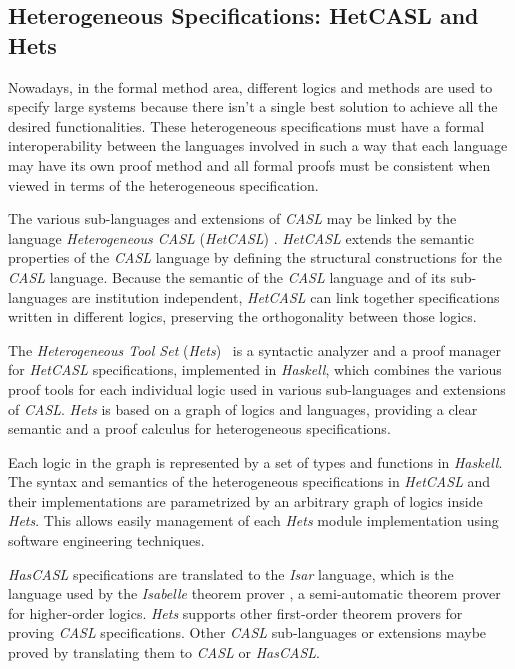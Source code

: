 \documentclass[12pt,twoside]{article}
\numberwithin{spec}{subsection}
\numberwithin{proof}{subsection}
\numberwithin{figure}{subsection}
\numberwithin{code}{subsection}
\begin{document}
\subsection{Heterogeneous Specifications: HetCASL and Hets}
Nowadays, in the formal method area, different logics and methods are used to specify large systems because there isn't a single best solution to achieve all the desired functionalities. These heterogeneous specifications must have a formal interoperability between the languages involved in such a way that each language may have its own proof method and all formal proofs must be consistent when viewed in terms of the heterogeneous specification. 

The various sub-languages and extensions of \textit{CASL} may be linked by the language \textit{Heterogeneous CASL} (\textit{HetCASL}) \citep{MossakowskiEtAl07b}. \textit{HetCASL} extends the semantic properties of the \textit{CASL} language by defining the structural constructions for the \textit{CASL} language. Because the semantic of the \textit{CASL} language and of its sub-languages are institution independent, \textit{HetCASL} can link together specifications written in different logics, preserving the orthogonality between those logics.

The \textit{Heterogeneous Tool Set} (\textit{Hets})~\citep{MossakowskiEtAl07b} is a syntactic analyzer and a proof manager for \textit{HetCASL} specifications, implemented in \textit{Haskell}, which combines the various proof tools for each individual logic used in various sub-languages and extensions of \textit{CASL}. \textit{Hets} is based on a graph of logics and languages, providing a clear semantic and a proof calculus for heterogeneous specifications.

Each logic in the graph is represented by a set of types and functions in \textit{Haskell}. The syntax and semantics of the heterogeneous specifications in \textit{HetCASL} and their implementations are parametrized by an arbitrary graph of logics inside \textit{Hets}. This allows easily management of each \textit{Hets} module implementation using software engineering techniques.

\textit{HasCASL} specifications are translated to the \textit{Isar} language, which is the language used by the \textit{Isabelle} theorem prover \citep{Nipkow-Paulson-Wenzel:2002}, a semi-automatic theorem prover for higher-order logics. \textit{Hets} supports other first-order theorem provers for proving \textit{CASL} specifications. Other \textit{CASL} sub-languages or extensions maybe proved by translating them to \textit{CASL} or \textit{HasCASL}.
\end{document}
